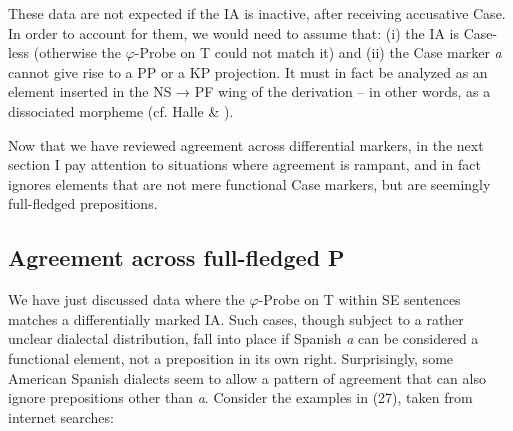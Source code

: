 \documentclass[output=paper]{langsci/langscibook}
\begin{document}
These data are not expected if the IA is inactive, after receiving accusative Case. In order to account for them, we would need to assume that: (i) the IA is Case-less (otherwise the $\varphi $-Probe on T could not match it) and (ii) the Case marker \textit{a} cannot give rise to a PP or a KP projection. It must in fact be analyzed as an element inserted in the NS → PF wing of the derivation – in other words, as a dissociated morpheme (cf. Halle \& \citealt{Marantz1993}).

  Now that we have reviewed agreement across differential markers, in the next section I pay attention to situations where agreement is rampant, and in fact ignores elements that are not mere functional Case markers, but are seemingly full-fledged prepositions.

\subsection{Agreement across full-fledged P}%

We have just discussed data where the $\varphi $-Probe on T within SE sentences matches a differentially marked IA. Such cases, though subject to a rather unclear dialectal distribution, fall into place if Spanish \textit{a} can be considered a functional element, not a preposition in its own right. Surprisingly, some American Spanish dialects seem to allow a pattern of agreement that can also ignore prepositions other than \textit{a}. Consider the examples in (27), taken from internet searches:
\end{document}

